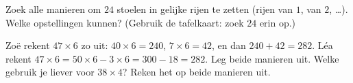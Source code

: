 \begin{exercise}[$\star\star$]\label{exo:g3:mult:11}
Zoek alle manieren om $24$ stoelen in gelijke rijen te zetten (rijen van
$1$, van $2$, \dots). Welke opstellingen kunnen? (Gebruik de tafelkaart:
zoek $24$ erin op.)
\end{exercise}

\begin{exercise}[$\star\star$]\label{exo:g3:mult:12}
Zoë rekent $47 \times 6$ zo uit: $40 \times 6 = 240$,
$7 \times 6 = 42$, en dan $240 + 42 = 282$. Léa rekent
$47 \times 6 = 50 \times 6 - 3 \times 6 = 300 - 18 = 282$. Leg beide
manieren uit. Welke gebruik je liever voor $38 \times 4$? Reken het op
beide manieren uit.
\end{exercise}
